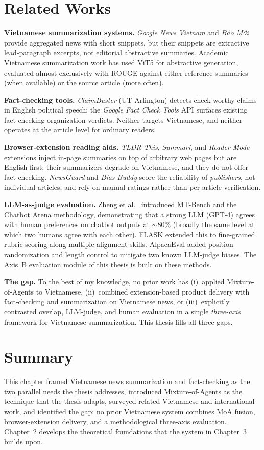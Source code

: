 \section{Related Works}

\textbf{Vietnamese summarization systems.}
\textit{Google News Vietnam} and \textit{Báo Mới} provide aggregated news with
short snippets, but their snippets are extractive lead-paragraph excerpts,
not editorial abstractive summaries. Academic Vietnamese summarization work
has used ViT5 \cite{Nguyen2022} for abstractive
generation, evaluated almost exclusively with ROUGE against either reference
summaries (when available) or the source article (more often).

\textbf{Fact-checking tools.}
\textit{ClaimBuster} (UT Arlington) detects check-worthy claims in English
political speech; the \textit{Google Fact Check Tools} API surfaces existing
fact-checking-organization verdicts. Neither targets Vietnamese, and neither
operates at the article level for ordinary readers.

\textbf{Browser-extension reading aids.}
\textit{TLDR This}, \textit{Summari}, and \textit{Reader Mode} extensions
inject in-page summaries on top of arbitrary web pages but are
English-first; their summarizers degrade on Vietnamese, and they do not
offer fact-checking. \textit{NewsGuard} and \textit{Bias Buddy} score the
reliability of \textit{publishers}, not individual articles, and rely on
manual ratings rather than per-article verification.

\textbf{LLM-as-judge evaluation.}
Zheng et al.\ \cite{Zheng2023} introduced MT-Bench and the Chatbot Arena
methodology, demonstrating that a strong LLM (GPT-4) agrees with human
preferences on chatbot outputs at $\sim$80\% (broadly the same level at
which two humans agree with each other). FLASK \cite{Ye2023} extended this
to fine-grained rubric scoring along multiple alignment skills.
AlpacaEval \cite{Dubois2024} added position randomization and length
control to mitigate two known LLM-judge biases. The Axis~B evaluation
module of this thesis is built on these methods.

\textbf{The gap.}
To the best of my knowledge, no prior work has (i)~applied Mixture-of-Agents
to Vietnamese, (ii)~combined extension-based product delivery with
fact-checking and summarization on Vietnamese news, or (iii)~explicitly
contrasted overlap, LLM-judge, and human evaluation in a single
\textit{three-axis} framework for Vietnamese summarization. This thesis fills
all three gaps.

\section{Summary}

This chapter framed Vietnamese news summarization and fact-checking as the
two parallel needs the thesis addresses, introduced Mixture-of-Agents as the
technique that the thesis adapts, surveyed related Vietnamese and
international work, and identified the gap: no prior Vietnamese system
combines MoA fusion, browser-extension delivery, and a methodological three-axis evaluation. Chapter~2 develops the theoretical
foundations that the system in Chapter~3 builds upon.
